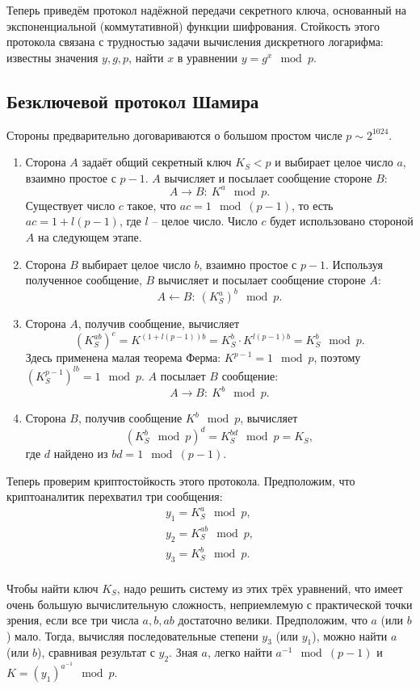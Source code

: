 Теперь приведём протокол надёжной передачи секретного ключа, основанный на экспоненциальной (коммутативной) функции шифрования. Стойкость этого протокола связана с трудностью задачи вычисления дискретного логарифма: известны значения $y, g, p$, найти $x$ в уравнении $y = g^x \mod p$.

\subsection{Безключевой протокол Шамира}

Стороны предварительно договариваются о большом простом числе $p \sim 2^{1024}$.

\begin{enumerate}
    \item Сторона $A$ задаёт общий секретный ключ $K_S < p$ и выбирает целое число $a$, взаимно простое с $p-1$. $A$ вычисляет и посылает сообщение стороне $B$:
            \[ A \rightarrow B: ~ K^a \mod p. \]
        Существует число $c$ такое, что $a c =1 \mod (p-1)$, то есть $a c = 1 + l (p-1)$, где $l$ -- целое число. Число $c$ будет использовано стороной $A$ на следующем этапе.
    \item Сторона $B$ выбирает целое число $b$, взаимно простое с $p-1$. Используя полученное сообщение, $B$ вычисляет и посылает сообщение стороне $A$:
            \[ A \leftarrow B: ~ (K_S^a)^b \mod p. \]
    \item Сторона $A$, получив сообщение, вычисляет
        \[ \left( K_S^{ab} \right)^c = K^{(1 + l (p-1)) b} = K_S^b \cdot K^{l (p-1) b} = K_S^b \mod p. \]
        Здесь применена малая теорема Ферма: $K^{p-1} = 1 \mod p$, поэтому $\left( K_S^{p-1} \right)^{lb} = 1 \mod p$.
        $A$ посылает $B$ сообщение:
            \[ A \rightarrow B: ~ K^b \mod p. \]
    \item Сторона $B$, получив сообщение $K^{b}\mod p$, вычисляет
        \[ (K_S^b \mod p)^d = K_S^{bd} \mod p = K_S, \]
        где $d$ найдено из $b d =1 \mod (p-1)$.
\end{enumerate}

Теперь проверим криптостойкость этого протокола. Предположим, что криптоаналитик перехватил три сообщения:
\[ \begin{array}{l}
    y_1 = K_S^a \mod p, \\
    y_2 = K_S^{ab} \mod p, \\
    y_3 = K_S^b \mod p. \\
\end{array} \]

Чтобы найти ключ $K_S$, надо решить систему из этих трёх уравнений, что имеет очень большую вычислительную сложность, неприемлемую с практической точки зрения, если все три числа $a, b, ab$ достаточно велики. Предположим, что $a$ (или $b$) мало. Тогда, вычисляя последовательные степени $y_3$ (или $y_1$), можно найти $a$ (или $b$), сравнивая результат с $y_2$. Зная $a$, легко найти $a^{-1}\mod(p-1)$ и $K=(y_1)^{a^{-1}}\mod p$.


